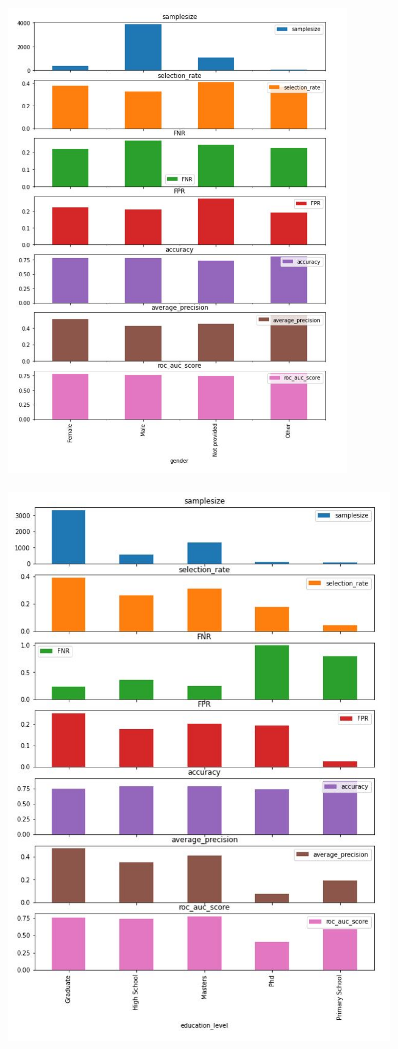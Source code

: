 \begin{figure}[H]
    \centering
\includegraphics[width=0.8\textwidth]{gender.JPG}
    \label{fig: 1}
\end{figure}
\begin{figure}
    \centering
\includegraphics[width=0.9\textwidth]{education.JPG}
    \label{fig: 2}
\end{figure}
